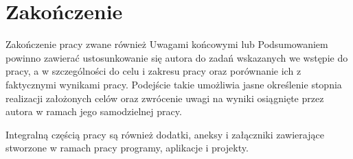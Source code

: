 
\chapter{Zakończenie}

Zakończenie pracy zwane również Uwagami końcowymi lub Podsumowaniem powinno zawierać ustosunkowanie
się autora do zadań wskazanych we wstępie do pracy, a w szczególności do celu i zakresu pracy oraz
porównanie ich z faktycznymi wynikami pracy. Podejście takie umożliwia jasne określenie stopnia
realizacji założonych celów oraz zwrócenie uwagi na wyniki osiągnięte przez autora w ramach jego
samodzielnej pracy.

Integralną częścią pracy są również dodatki, aneksy i załączniki zawierające stworzone w ramach pracy programy, aplikacje i projekty.


